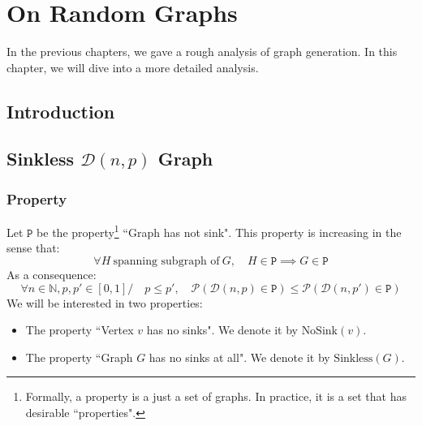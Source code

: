 \chapter{On Random Graphs}
In the previous chapters, we gave a rough analysis of graph generation.
\newline In this chapter, we will dive into a more detailed analysis.

\section{Introduction}
\section{Sinkless $\mathcal{D}(n,p)$ Graph}

\subsection{Property}

Let $\mathtt{P}$ be the property\footnote{Formally, a property is a just a set of graphs. In practice, it is a set that has desirable ``properties".} ``Graph has not sink".
\newline This property is increasing in the sense that:
$$
\forall H \ \text{spanning subgraph of}\ G, \quad H \in \mathtt{P}\implies G\in\mathtt{P}
$$
As a consequence:
$$
\forall n\in\mathbb{N},p,p'\in[0,1] / \quad p\le p',\quad \mathscr{P}(\mathcal{D}(n,p)\in \mathtt{P}) \le \mathscr{P}(\mathcal{D}(n,p')\in \mathtt{P})
$$
We will be interested in two properties:
\begin{itemize}
	\item The property ``Vertex $v$ has no sinks". We denote it by $\text{NoSink}(v)$.
	\item The property ``Graph $G$ has no sinks at all". We denote it by $\text{Sinkless}(G)$.
\end{itemize}


